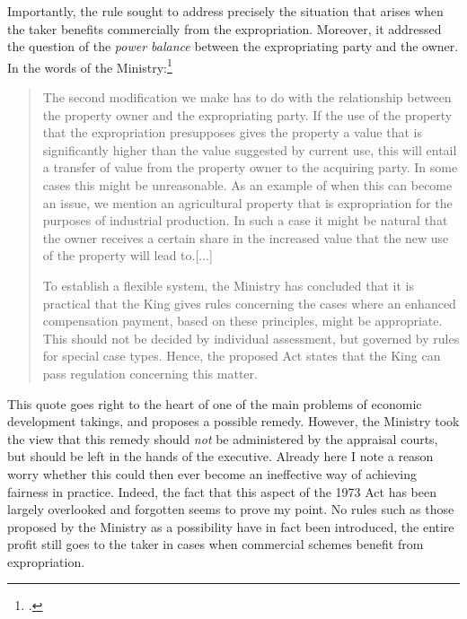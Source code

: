 Importantly, the rule sought to address precisely the situation that arises when the taker benefits commercially from the expropriation. Moreover, it addressed the question of the \emph{power balance} between the expropriating party and the owner. In the words of the Ministry:\footcite[19]{otprp70}

\begin{quote}
The second modification we make has to do with the relationship between the property owner and the expropriating party. If the use of the property that the expropriation presupposes gives the property a value that is significantly higher than the value suggested by current use, this will entail a transfer of value from the property owner to the acquiring party. In some cases this might be unreasonable. As an example of when this can become an issue, we mention an agricultural property that is expropriation for the purposes of industrial production. In such a case it might be natural that the owner receives a certain share in the increased value that the new use of the property will lead to.[...] %

To establish a flexible system, the Ministry has concluded that it is practical that the King gives rules concerning the cases where an enhanced compensation payment, based on these principles, might be appropriate. This should not be decided by individual assessment, but governed by rules for special case types. Hence, the proposed Act states that the King can pass regulation concerning this matter.
\end{quote}

This quote goes right to the heart of one of the main problems of economic development takings, and proposes a possible remedy. However, the Ministry took the view that this remedy should {\it not} be administered by the appraisal courts, but should be left in the hands of the executive. Already here I note a reason worry whether this could then ever become an ineffective way of achieving fairness in practice. Indeed, the fact that this aspect of the 1973 Act has been largely overlooked and forgotten seems to prove my point. No rules such as those proposed by the Ministry as a possibility have in fact been introduced, the entire profit still goes to the taker in cases when commercial schemes benefit from expropriation.

